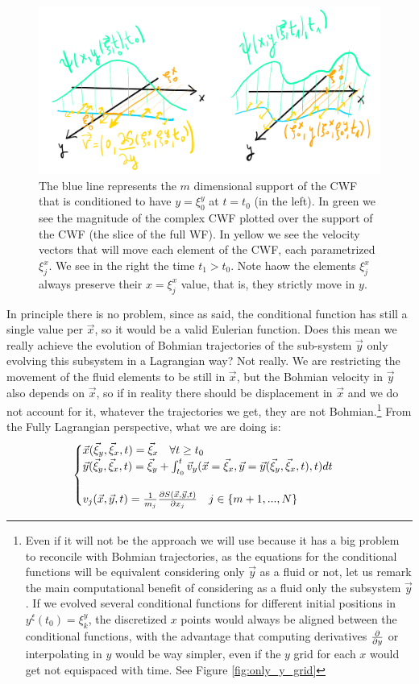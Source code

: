 \documentclass[11pt, a4paper]{article} %
\DeclareRobustCommand{\mybox}[2][gray!10]{%
\begin{tcolorbox}[   %
        left=0.2cm,
        right=0.2cm,
        top=0.15cm,
        bottom=0.15cm,
        colback=#1,
        colframe=#1,
        width=\dimexpr\textwidth\relax, 
        enlarge left by=0mm,
        boxsep=5pt,
        arc=0pt,outer arc=0pt,
        ]
        #2
\end{tcolorbox}
}
\begin{document}
\begin{figure}[h!]
  \centering
    \includegraphics[width=0.65\linewidth]{unstructure_aligned.png}
  \caption{The blue line represents the $m$ dimensional support of the CWF that is conditioned to have $y=\xi^y_0$ at $t=t_0$ (in the left). In green we see the magnitude of the complex CWF plotted over the support of the CWF (the slice of the full WF). In yellow we see the velocity vectors that will move each element of the CWF, each parametrized $\xi^x_j$. We see in the right the time $t_1>t_0$. Note haow the elements $\xi^x_j$ always preserve their $x=\xi^x_j$ value, that is, they strictly move in $y$. }
  \label{fig:only_y}
\end{figure}
\mybox{
In principle there is no problem, since as said, the conditional function has still a single value per $\vec{x}$, so it would be a valid Eulerian function. Does this mean we really achieve the evolution of Bohmian trajectories of the sub-system $\vec{y}$ only evolving this subsystem in a Lagrangian way? Not really. We are restricting the movement of the fluid elements to be still in $\vec{x}$, but the Bohmian velocity in $\vec{y}$ also depends on $\vec{x}$, so if in reality there should be displacement in $\vec{x}$ and we do not account for it, whatever the trajectories we get, they are not Bohmian.\footnote{
Even if it will not be the approach we will use because it has a big problem to reconcile with Bohmian trajectories, as the equations for the conditional functions will be equivalent considering only $\vec{y}$ as a fluid or not, let us remark the main computational benefit of considering as a fluid only the subsystem $\vec{y}$. If we evolved several conditional functions for different initial positions in $y^\xi(t_0)=\xi^y_k$, the discretized $x$ points would always be aligned between the conditional functions, with the advantage that computing derivatives $\pdv{}{y}$ or interpolating in $y$ would be way simpler, even if the $y$ grid for each $x$ would get not equispaced with time. See Figure \ref{fig:only_y_grid}} From the Fully Lagrangian perspective, what we are doing is:
\begin{equation}\label{a}
\begin{cases}
\vec{x}(\vec{\xi}_y, \vec{\xi}_x,t)=\vec{\xi}_x \quad \forall t\geq t_0\\
\vec{y}(\vec{\xi}_y, \vec{\xi}_x,t)=\vec{\xi}_y+\int_{t_0}^t \vec{v}_y(\vec{x}=\vec{\xi}_x, \vec{y}=\vec{y}(\vec{\xi}_y, \vec{\xi}_x,t),t)dt\\ \\
v_j(\vec{x}, \vec{y},t)=\frac{1}{m_j}\pdv{S(\vec{x}, \vec{y},t)}{x_j}\quad j\in\{m+1,...,N \}
\end{cases}
\end{equation}
}
\end{document}
